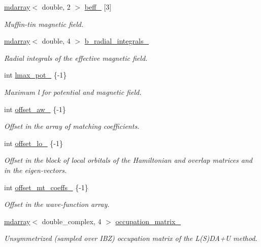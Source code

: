 \begin{DoxyCompactItemize}
\hyperlink{classsddk_1_1mdarray}{mdarray}$<$ double, 2 $>$ \hyperlink{classsirius_1_1_atom_a77acbab247233e4eab5bebc1bb4f3d98}{beff\+\_\+} \mbox{[}3\mbox{]}
\begin{DoxyCompactList}\small\item\em Muffin-\/tin magnetic field. \end{DoxyCompactList}\item 
\hyperlink{classsddk_1_1mdarray}{mdarray}$<$ double, 4 $>$ \hyperlink{classsirius_1_1_atom_a3d2c072bba1d9841386e465b1e892e0d}{b\+\_\+radial\+\_\+integrals\+\_\+}
\begin{DoxyCompactList}\small\item\em Radial integrals of the effective magnetic field. \end{DoxyCompactList}\item 
int \hyperlink{classsirius_1_1_atom_a98c17af482e25dac1a79a76360e875bf}{lmax\+\_\+pot\+\_\+} \{-\/1\}
\begin{DoxyCompactList}\small\item\em Maximum l for potential and magnetic field. \end{DoxyCompactList}\item 
int \hyperlink{classsirius_1_1_atom_a587631a61db11697dfcbe35c58f30d60}{offset\+\_\+aw\+\_\+} \{-\/1\}
\begin{DoxyCompactList}\small\item\em Offset in the array of matching coefficients. \end{DoxyCompactList}\item 
int \hyperlink{classsirius_1_1_atom_ae653666636a40ecd1f48595d744a7ad4}{offset\+\_\+lo\+\_\+} \{-\/1\}
\begin{DoxyCompactList}\small\item\em Offset in the block of local orbitals of the Hamiltonian and overlap matrices and in the eigen-\/vectors. \end{DoxyCompactList}\item 
int \hyperlink{classsirius_1_1_atom_a0b5a7713f5d959a10c5924288c9c0fc4}{offset\+\_\+mt\+\_\+coeffs\+\_\+} \{-\/1\}
\begin{DoxyCompactList}\small\item\em Offset in the wave-\/function array. \end{DoxyCompactList}\item 
\hyperlink{classsddk_1_1mdarray}{mdarray}$<$ double\+\_\+complex, 4 $>$ \hyperlink{classsirius_1_1_atom_a8c4ee868930d86572a234d1c10dd8afc}{occupation\+\_\+matrix\+\_\+}
\begin{DoxyCompactList}\small\item\em Unsymmetrized (sampled over I\+B\+Z) occupation matrix of the L(\+S)D\+A+\+U method. \end{DoxyCompactList}\item 

\end{DoxyCompactItemize}

